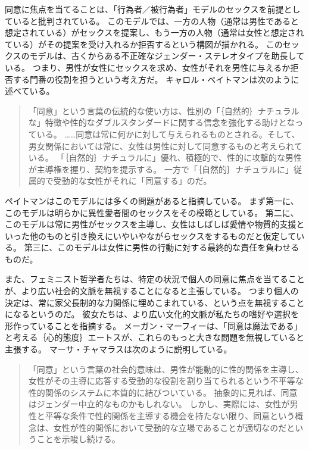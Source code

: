 \documentclass[paper=a4,book,openany]{jlreq}
\newcommand{\ig}[1]{}           %
\begin{document}
同意に焦点を当てることは、「行為者／被行為者」モデルのセックスを前提としていると批判されている。
このモデルでは、一方の人物（通常は男性であると想定されている）がセックスを提案し、もう一方の人物（通常は女性と想定されている）がその提案を受け入れるか拒否するという構図が描かれる。
このセックスのモデルは、古くからある不正確なジェンダー・ステレオタイプを助長している。
つまり、男性が女性にセックスを求め、女性がそれを男性に与えるか拒否する門番の役割を担うという考え方だ。
キャロル・ペイトマンは次のように述べている。

\begin{quote}
「同意」という言葉の伝統的な使い方は、性別の「｛自然的｝{ナチュラル}な」特徴や性的なダブルスタンダードに関する信念を強化する助けとなっている。
……同意は常に何かに対して与えられるものとされる。そして、男女関係においては常に、女性は男性に対して同意するものと考えられている。
「｛自然的｝{ナチュラル}に」優れ、積極的で、性的に攻撃的な男性が主導権を握り、契約を提示する。
一方で「｛自然的｝{ナチュラル}に」従属的で受動的な女性がそれに「同意する」のだ。
\citep[p.164]{pateman80:_woman_consen}
\end{quote}

ペイトマンはこのモデルには多くの問題があると指摘している。
まず第一に、このモデルは明らかに異性愛者間のセックスをその模範としている。
第二に、このモデルは常に男性がセックスを主導し、女性はしばしば愛情や物質的支援といった他のものと引き換えにいやいやながらセックスをするものだと仮定している。
第三に、このモデルは女性に男性の行動に対する最終的な責任を負わせるものだ。

また、フェミニスト哲学者たちは、特定の状況で個人の同意に焦点を当てることが、より広い社会的文脈を無視することになると主張している。
つまり個人の決定は、常に家父長制的な力関係に埋めこまれている、という点を無視することになるというのだ。
彼女たちは、より広い文化的文脈が私たちの嗜好や選択を形作っていることを指摘する。
メーガン・マーフィー\ig{Meghan Murphy}は、「同意は魔法である」と考える｛心的態度｝{エートス}が、これらのもっと大きな問題を無視していると主張する\citep{murphy13:_tyran_consen}。
マーサ・チャマラスは次のように説明している。

\begin{quote}
  「同意」という言葉の社会的意味は、男性が能動的に性的関係を主導し、女性がその主導に応答する受動的な役割を割り当てられるという不平等な性的関係のシステムに本質的に結びついている。
抽象的に見れば、同意はジェンダー中立的なものかもしれない。
しかし、実際には、女性が男性と平等な条件で性的関係を主導する機会を持たない限り、同意という概念は、女性が性的関係において受動的な立場であることが適切なのだということを示唆し続ける。
\citep[pp.814-815]{chamallas88:_consen_equal_legalb}
\end{quote}
\end{document}
